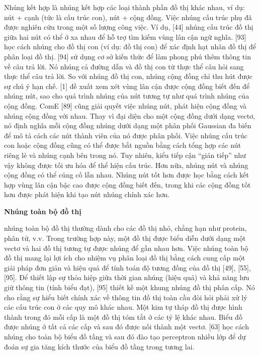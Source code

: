 Nhúng kết hợp là nhúng kết hợp các loại thành phần đồ thị khác nhau, ví dụ: nút + cạnh (tức là cấu trúc con), nút + cộng đồng. Việc nhúng cấu trúc phụ đã được nghiên cứu trong một số lượng công việc. Ví dụ, [44] nhúng cấu trúc đồ thị giữa hai nút có thể ở xa nhau để hỗ trợ tìm kiếm vùng lân cận ngữ nghĩa. [93] học cách nhúng cho đồ thị con (ví dụ: đồ thị con) để xác định hạt nhân đồ thị để phân loại đồ thị. [94] sử dụng cơ sở kiến ​​thức để làm phong phú thêm thông tin về câu trả lời. Nó nhúng cả đường dẫn và đồ thị con từ thực thể câu hỏi sang thực thể câu trả lời. So với nhúng đồ thị con, nhúng cộng đồng chỉ thu hút được sự chú ý hạn chế. [1] đề xuất xem xét vùng lân cận được cộng đồng biết đến để nhúng nút, sao cho quá trình nhúng của nút tương tự như quá trình nhúng của cộng đồng. ComE [89] cũng giải quyết việc nhúng nút, phát hiện cộng đồng và nhúng cộng đồng với nhau. Thay vì đại diện cho một cộng đồng dưới dạng vectơ, nó định nghĩa mỗi cộng đồng nhúng dưới dạng một phân phối Gaussian đa biến để mô tả cách các nút thành viên của nó được phân phối. Việc nhúng cấu trúc con hoặc cộng đồng cũng có thể được bắt nguồn bằng cách tổng hợp các nút riêng lẻ và nhúng cạnh bên trong nó. Tuy nhiên, kiểu tiếp cận “gián tiếp” như vậy không được tối ưu hóa để thể hiện cấu trúc. Hơn nữa, nhúng nút và nhúng cộng đồng có thể củng cố lẫn nhau. Nhúng nút tốt hơn được học bằng cách kết hợp vùng lân cận bậc cao được cộng đồng biết đến, trong khi các cộng đồng tốt hơn được phát hiện khi tạo nút nhúng chính xác hơn.

\textbf{Nhúng toàn bộ đồ thị}

nhúng toàn bộ đồ thị thường dành cho các đồ thị nhỏ, chẳng hạn như protein, phân tử, v.v. Trong trường hợp này, một đồ thị được biểu diễn dưới dạng một vectơ và hai đồ thị tương tự được nhúng để gần nhau hơn. Việc nhúng toàn bộ đồ thị mang lại lợi ích cho nhiệm vụ phân loại đồ thị bằng cách cung cấp một giải pháp đơn giản và hiệu quả để tính toán độ tương đồng của đồ thị [49], [55], [95]. Để thiết lập sự thỏa hiệp giữa thời gian nhúng (hiệu quả) và khả năng lưu giữ thông tin (tính biểu đạt), [95] thiết kế một khung nhúng đồ thị phân cấp. Nó cho rằng sự hiểu biết chính xác về thông tin đồ thị toàn cầu đòi hỏi phải xử lý các cấu trúc con ở các quy mô khác nhau. Một kim tự tháp đồ thị được hình thành trong đó mỗi cấp là một đồ thị tóm tắt ở các tỷ lệ khác nhau. Biểu đồ được nhúng ở tất cả các cấp và sau đó được nối thành một vectơ. [63] học cách nhúng cho toàn bộ biểu đồ tầng và sau đó đào tạo perceptron nhiều lớp để dự đoán sự gia tăng kích thước của biểu đồ tầng trong tương lai.

